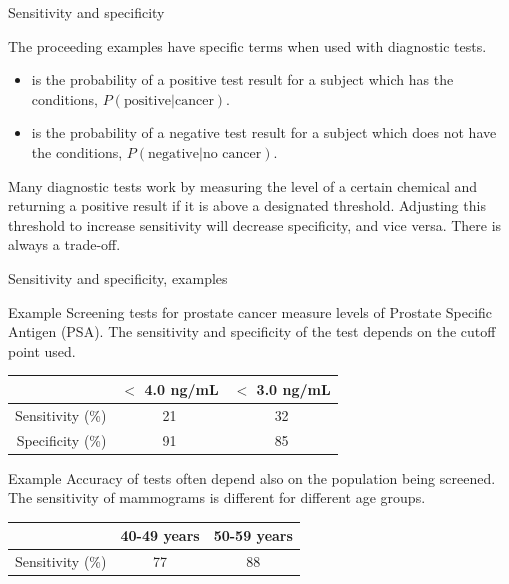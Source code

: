 \documentclass[xcolor=table]{beamer}
\begin{document}
\begin{frame}{Sensitivity and specificity}
\begin{block}{}
\large
The proceeding examples have specific terms when used with diagnostic tests.
\begin{itemize}
\pause
\item {} is the probability of a positive test result for a subject which has the conditions, $P(\text{positive}|\text{cancer})$.
\pause
\item {} is the probability of a negative test result for a subject which does not have the conditions, $P(\text{negative}|\text{no cancer})$.
\end{itemize}

\pause
Many diagnostic tests work by measuring the level of a certain chemical and returning a positive result if it is above a designated threshold. Adjusting this threshold to increase sensitivity will decrease specificity, and vice versa. There is always a trade-off.
\end{block}
\end{frame}


\begin{frame}{Sensitivity and specificity, examples}
\begin{exampleblock}{Example}
\large
Screening tests for prostate cancer measure levels of Prostate Specific Antigen (PSA). The sensitivity and specificity of the test depends on the cutoff point used.\\
\medskip
{\centering
{}
\begin{tabular}{r | c c}
& $<$ 4.0 ng/mL & $<$ 3.0 ng/mL\\
\hline
Sensitivity (\%) & 21 & 32\\
Specificity (\%) & 91 & 85 
\end{tabular}
\par}
\end{exampleblock}
\pause
\begin{exampleblock}{Example}
\large
Accuracy of tests often depend also on the population being screened. The sensitivity of mammograms is different for different age groups.\\
\medskip
{\centering
{}
\begin{tabular}{r | c c}
& 40-49 years & 50-59 years\\
\hline
Sensitivity (\%) & 77 & 88\\
\end{tabular}
\par}
\end{exampleblock}
\end{frame}
\end{document}

